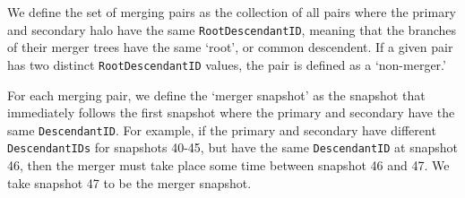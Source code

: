 \documentclass[twocolumn,linenumbers]{aastex631}
\begin{document}
We define the set of merging pairs as the collection of all pairs where the primary and secondary halo have the same \texttt{RootDescendantID}, meaning that the branches of their merger trees have the same `root', or common descendent. 
If a given pair has two distinct \texttt{RootDescendantID} values, the pair is defined as a `non-merger.'

For each merging pair, we define the `merger snapshot' as the snapshot that immediately follows the first snapshot where the primary and secondary have the same \texttt{DescendantID}. 
For example, if the primary and secondary have different \texttt{DescendantIDs} for snapshots 40-45, but have the same \texttt{DescendantID} at snapshot 46, then the merger must take place some time between snapshot 46 and 47. 
We take snapshot 47 to be the merger snapshot. 
\end{document}
